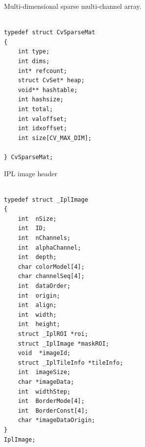 \label{CvSparseMat}

Multi-dimensional sparse multi-channel array.

\begin{lstlisting}

typedef struct CvSparseMat
{
    int type;
    int dims; 
    int* refcount; 
    struct CvSet* heap; 
    void** hashtable; 
    int hashsize;
    int total; 
    int valoffset; 
    int idxoffset; 
    int size[CV_MAX_DIM]; 

} CvSparseMat;

\end{lstlisting}

\begin{description}
\end{description}

\label{IplImage}

IPL image header

\begin{lstlisting}

typedef struct _IplImage
{
    int  nSize;         
    int  ID;            
    int  nChannels;     
    int  alphaChannel;  
    int  depth;         
    char colorModel[4]; 
    char channelSeq[4]; 
    int  dataOrder;     
    int  origin;        
    int  align;         
    int  width;         
    int  height;        
    struct _IplROI *roi; 
    struct _IplImage *maskROI; 
    void  *imageId;     
    struct _IplTileInfo *tileInfo; 
    int  imageSize;                             
    char *imageData;  
    int  widthStep;   
    int  BorderMode[4]; 
    int  BorderConst[4]; 
    char *imageDataOrigin; 
}
IplImage;

\end{lstlisting}

